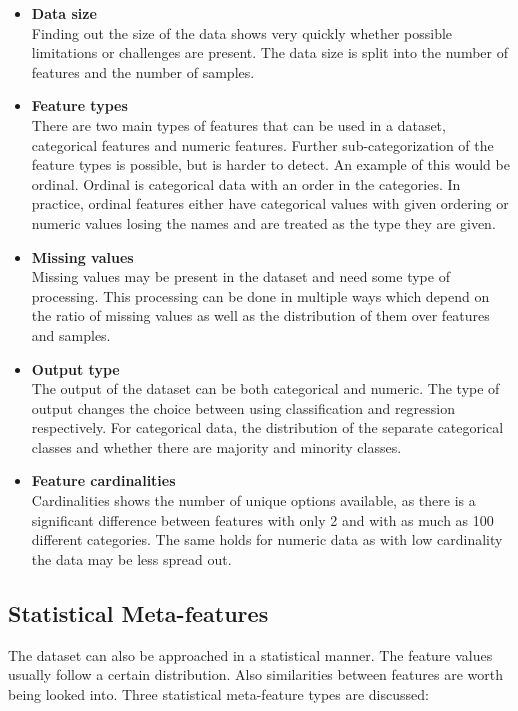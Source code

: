 \documentclass[10pt,a4paper]{report}
\begin{document}
	\begin{itemize}
		\item \textbf{Data size} \\
		Finding out the size of the data shows very quickly whether possible limitations or challenges are present. The data size is split into the number of features and the number of samples.
		\item \textbf{Feature types} \\
		There are two main types of features that can be used in a dataset, categorical features and numeric features. Further sub-categorization of the feature types is possible, but is harder to detect. An example of this would be ordinal. Ordinal is categorical data with an order in the categories. In practice, ordinal features either have categorical values with given ordering or numeric values losing the names and are treated as the type they are given.
		\item \textbf{Missing values} \\
		Missing values may be present in the dataset and need some type of processing. This processing can be done in multiple ways which depend on the ratio of missing values as well as the distribution of them over features and samples.
		\item \textbf{Output type} \\
		The output of the dataset can be both categorical and numeric. The type of output changes the choice between using classification and regression respectively. For categorical data, the distribution of the separate categorical classes and whether there are majority and minority classes.
		\item \textbf{Feature cardinalities} \\
		Cardinalities shows the number of unique options available, as there is a significant difference between features with only 2 and with as much as 100 different categories. The same holds for numeric data as with low cardinality the data may be less spread out.
	\end{itemize}
	
	\subsection{Statistical Meta-features}
	\label{subsec:StatisticalMF}
	
	The dataset can also be approached in a statistical manner. The feature values usually follow a certain distribution. Also similarities between features are worth being looked into. Three statistical meta-feature types are discussed:
	
\end{document}
